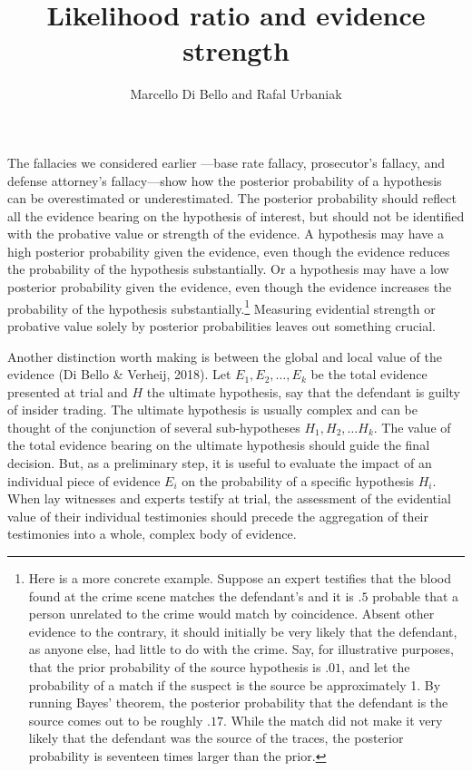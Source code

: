 \documentclass[
  10pt,
  dvipsnames,enabledeprecatedfontcommands]{scrartcl}
\title{Likelihood ratio and evidence strength}
\author{Marcello Di Bello and Rafal Urbaniak}
\date{}
\begin{document}
\maketitle

The fallacies we considered earlier ---base rate
fallacy, prosecutor's fallacy, and defense attorney's fallacy---show how
the posterior probability of a hypothesis can be overestimated or
underestimated. The posterior probability should reflect all the
evidence bearing on the hypothesis of interest, but should not be
identified with the probative value or strength of the evidence. A
hypothesis may have a high posterior probability given the evidence,
even though the evidence reduces the probability of the hypothesis
substantially. Or a hypothesis may have a low posterior probability
given the evidence, even though the evidence increases the probability
of the hypothesis substantially.\footnote{Here is a more concrete
  example. Suppose an expert testifies that the blood found at the crime
  scene matches the defendant's and it is \(.5\) probable that a person
  unrelated to the crime would match by coincidence. Absent other
  evidence to the contrary, it should initially be very likely that the
  defendant, as anyone else, had little to do with the crime. Say, for
  illustrative purposes, that the prior probability of the source
  hypothesis is \(.01\), and let the probability of a match if the
  suspect is the source be approximately 1. By running Bayes' theorem,
  the posterior probability that the defendant is the source comes out
  to be roughly \(.17\). While the match did not make it very likely
  that the defendant was the source of the traces, the posterior
  probability is seventeen times larger than the prior.} Measuring
evidential strength or probative value solely by posterior probabilities
leaves out something crucial.

Another distinction worth making is between the global and local value
of the evidence (Di Bello \& Verheij, 2018). Let \(E_1,E_2,\dots, E_k\)
be the total evidence presented at trial and \(H\) the ultimate
hypothesis, say that the defendant is guilty of insider trading. The
ultimate hypothesis is usually complex and can be thought of the
conjunction of several sub-hypotheses \(H_1, H_2, \dots H_k\). The value
of the total evidence bearing on the ultimate hypothesis should guide
the final decision. But, as a preliminary step, it is useful to evaluate
the impact of an individual piece of evidence \(E_i\) on the probability
of a specific hypothesis \(H_i\). When lay witnesses and experts testify
at trial, the assessment of the evidential value of their individual
testimonies should precede the aggregation of their testimonies into a
whole, complex body of evidence.
\end{document}
